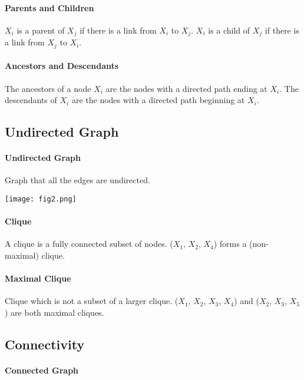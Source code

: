 \paragraph{Parents and Children}

$X_i$ is a parent of $X_j$ if there is a link from $X_i$ to $X_j$. $X_i$ is a child of $X_j$ if there is a link from $X_j$ to $X_i$.

\paragraph{Ancestors and Descendants}

The ancestors of a node $X_i$ are the nodes with a directed path ending at $X_i$. The descendants of $X_i$ are the nodes with a directed path beginning at $X_i$.

\subsection{Undirected Graph}	

\paragraph{Undirected Graph}

Graph that all the edges are undirected.
\begin{figure*}[h]
	\centering
	\texttt{[image: fig2.png]}
\end{figure*}

\paragraph{Clique}

A clique is a fully connected subset of nodes. ($X_1$, $X_2$, $X_4$) forms a (non-maximal) clique.

\paragraph{Maximal Clique}

Clique which is not a subset of a larger clique. ($X_1$, $X_2$, $X_3$, $X_4$) and ($X_2$, $X_3$, $X_5$) are both maximal cliques.

\subsection{Connectivity}

\paragraph{Connected Graph}

